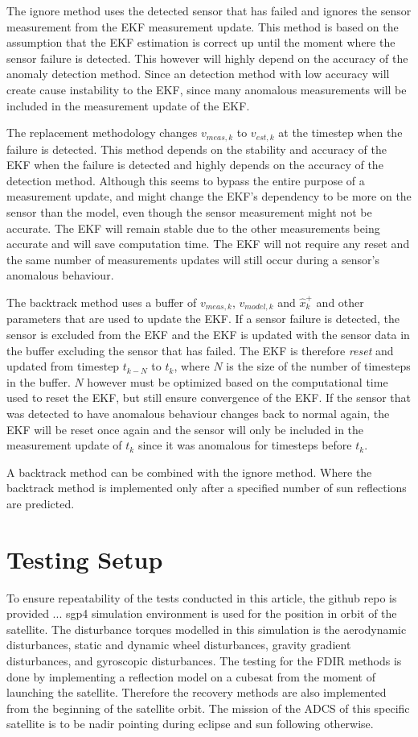 \documentclass[letterpaper, 10 pt, conference]{ieeeconf}  %
\begin{document}
The ignore method uses the detected sensor that has failed and ignores the sensor measurement from the EKF measurement update. This method is based on the assumption that the EKF estimation is correct up until the moment where the sensor failure is detected. This however will highly depend on the accuracy of the anomaly detection method. Since an detection method with low accuracy will create cause instability to the EKF, since many anomalous measurements will be included in the measurement update of the EKF.

The replacement methodology changes $v_{meas,k}$ to $v_{est,k}$ at the timestep when the failure is detected. This method depends on the stability and accuracy of the EKF when the failure is detected and highly depends on the accuracy of the detection method. Although this seems to bypass the entire purpose of a measurement update, and might change the EKF's dependency to be more on the sensor than the model, even though the sensor measurement might not be accurate. The EKF will remain stable due to the other measurements being accurate and will save computation time. The EKF will not require any reset and the same number of measurements updates will still occur during a sensor's anomalous behaviour.

The backtrack method uses a buffer of $v_{meas,k}$, $v_{model,k}$ and $\hat{x}_k^+$ and other parameters that are used to update the EKF. If a sensor failure is detected, the sensor is excluded from the EKF and the EKF is updated with the sensor data in the buffer excluding the sensor that has failed. The EKF is therefore \emph{reset} and updated from timestep $t_{k-N}$ to $t_k$, where $N$ is the size of the number of timesteps in the buffer. $N$ however must be optimized based on the computational time used to reset the EKF, but still ensure convergence of the EKF. If the sensor that was detected to have anomalous behaviour changes back to normal again, the EKF will be reset once again and the sensor will only be included in the measurement update of $t_k$ since it was anomalous for timesteps before $t_k$.

A backtrack method can be combined with the ignore method. Where the backtrack method is implemented only after a specified number of sun reflections are predicted.

\section{Testing Setup}
To ensure repeatability of the tests conducted in this article, the github repo is provided ...
sgp4 simulation environment is used for the position in orbit of the satellite. The disturbance torques modelled in this simulation is the aerodynamic disturbances, static and dynamic wheel disturbances, gravity gradient disturbances, and gyroscopic disturbances. The testing for the FDIR methods is done by implementing a reflection model on a cubesat from the moment of launching the satellite. Therefore the recovery methods are also implemented from the beginning of the satellite orbit. The mission of the ADCS of this specific satellite is to be nadir pointing during eclipse and sun following otherwise.
\end{document}
